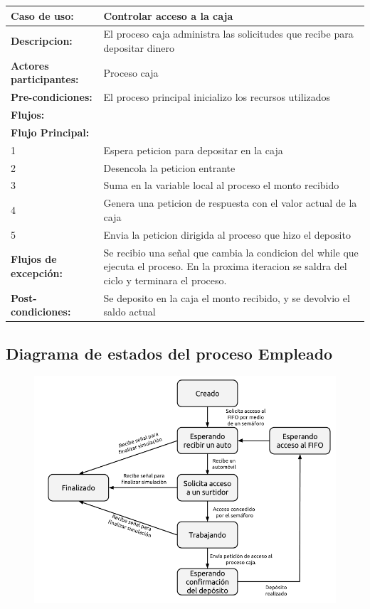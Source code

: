 \documentclass[12pt,a4paper,spanish]{article}
\begin{document}
	\begin{tabular}{|p{4cm}|p{12cm}|}
    \hline
    \textbf{Caso de uso:} & Controlar acceso a la caja \\
    \hline
    \textbf{Descripcion:} &  El proceso caja administra las solicitudes que recibe para depositar dinero\\
    \hline
    \textbf{Actores participantes:} & Proceso caja\\
    \hline
 
    \textbf{Pre-condiciones:} &  El proceso principal inicializo los recursos utilizados\\
    \hline
    \hline
    \textbf{Flujos:} &\\
    \hline
	\textbf{Flujo Principal:} &\\ 

	\hline
	1 & Espera peticion para depositar en la caja\\
	\hline
	2 & Desencola la peticion entrante\\
	\hline
	3 & Suma en la variable local al proceso el monto recibido\\
	\hline
	4 & Genera una peticion de respuesta con el valor actual de la caja\\
	\hline
	5 & Envia la peticion dirigida al proceso que hizo el deposito\\
	\hline
	\hline
	\textbf{Flujos de excepción:} & Se recibio una señal que cambia la condicion del while que ejecuta el proceso. En la proxima iteracion se saldra del ciclo y terminara el proceso.\\
    \hline

    \hline
	\textbf{Post-condiciones:} & Se deposito en la caja el monto recibido, y se devolvio el saldo actual\\
	\hline
	\end{tabular}

	\newpage
	\subsection{Diagrama de estados del proceso Empleado}

	\begin{figure}[h]
	\includegraphics[scale=0.60]{FSM_Empleado.png}
	\centering
	\end{figure}
\end{document}
